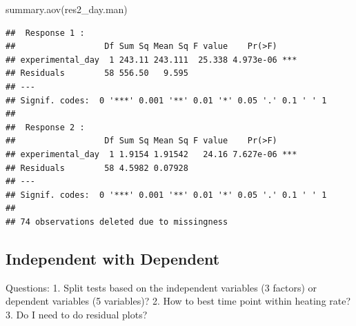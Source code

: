 \documentclass[
]{article}
\newenvironment{Shaded}{\begin{snugshade}}{\end{snugshade}}
\newcommand{\AttributeTok}[1]{\textcolor[rgb]{0.77,0.63,0.00}{#1}}
\newcommand{\FunctionTok}[1]{\textcolor[rgb]{0.00,0.00,0.00}{#1}}
\newcommand{\NormalTok}[1]{#1}
\newcommand{\OtherTok}[1]{\textcolor[rgb]{0.56,0.35,0.01}{#1}}
\newcommand{\SpecialCharTok}[1]{\textcolor[rgb]{0.00,0.00,0.00}{#1}}
\begin{document}
\begin{Shaded}
\begin{Highlighting}[]
\FunctionTok{summary.aov}\NormalTok{(res2\_day.man)}
\end{Highlighting}
\end{Shaded}

\begin{verbatim}
##  Response 1 :
##                  Df Sum Sq Mean Sq F value    Pr(>F)    
## experimental_day  1 243.11 243.111  25.338 4.973e-06 ***
## Residuals        58 556.50   9.595                      
## ---
## Signif. codes:  0 '***' 0.001 '**' 0.01 '*' 0.05 '.' 0.1 ' ' 1
## 
##  Response 2 :
##                  Df Sum Sq Mean Sq F value    Pr(>F)    
## experimental_day  1 1.9154 1.91542   24.16 7.627e-06 ***
## Residuals        58 4.5982 0.07928                      
## ---
## Signif. codes:  0 '***' 0.001 '**' 0.01 '*' 0.05 '.' 0.1 ' ' 1
## 
## 74 observations deleted due to missingness
\end{verbatim}

\hypertarget{independent-with-dependent}{%
\subsection{Independent with
Dependent}\label{independent-with-dependent}}

Questions: 1. Split tests based on the independent variables (3 factors)
or dependent variables (5 variables)? 2. How to best time point within
heating rate? 3. Do I need to do residual plots?

\begin{Shaded}
\end{Shaded}
\end{document}
